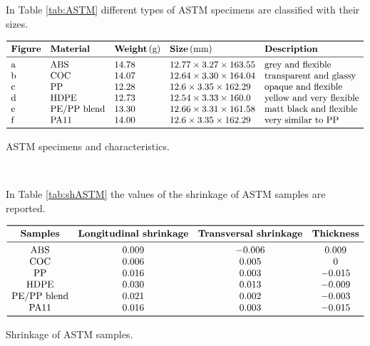 \documentclass[a4paper, 11pt]{article}
\begin{document}
In Table \ref{tab:ASTM} different types of ASTM specimens are classified with their sizes.
\begin{table}[htp]
\centering
$
\begin{array}{lllll}
\toprule
\textbf{Figure} & \textbf{Material} & \textbf{Weight}\,(\text{g}) & \textbf{Size}\,(\text{mm}) & \textbf{Description} \\
\midrule
\text{a} & \text{ABS} & 14.78 & 12.77\times 3.27\times 163.55 & \text{grey and flexible}\\
\text{b} & \text{COC} & 14.07 & 12.64\times 3.30\times 164.04 & \text{transparent and glassy}\\
\text{c} & \text{PP} & 12.28 & 12.6\times 3.35\times 162.29 & \text{opaque and flexible} \\
\text{d} & \text{HDPE} & 12.73 & 12.54\times 3.33\times 160.0 & \text{yellow and very flexible} \\
\text{e} & \text{PE/PP}\ \text{blend} & 13.30 & 12.66\times 3.31\times 161.58 & \text{matt black and flexible} \\
\text{f} & \text{PA11} & 14.00 & 12.6\times 3.35\times 162.29 & \text{very similar to PP} \\
\bottomrule
\end{array}
$
\caption{ASTM specimens and characteristics.}
\label{tab:ASTM}
\end{table}
\\

\newpage

In Table \ref{tab:shASTM} the values of the shrinkage of ASTM samples are reported.

\begin{table}[htp]
\centering
$
\begin{array}{cccc}
\toprule
\textbf{Samples} & \textbf{Longitudinal shrinkage} & \textbf{Transversal shrinkage} & \textbf{Thickness} \\
\midrule
\text{ABS} & 0.009 & -0.006 & 0.009  \\
\text{COC} & 0.006 & 0.005 & 0 \\
\text{PP} & 0.016 & 0.003& -0.015 \\
\text{HDPE} & 0.030 & 0.013 & -0.009 \\
\text{PE/PP blend} & 0.021 & 0.002 & -0.003 \\
\text{PA11} & 0.016 & 0.003& -0.015 \\
\bottomrule
\end{array}
$
\caption{Shrinkage of ASTM samples.}
\label{tab:shASTM}
\end{table}
\end{document}
